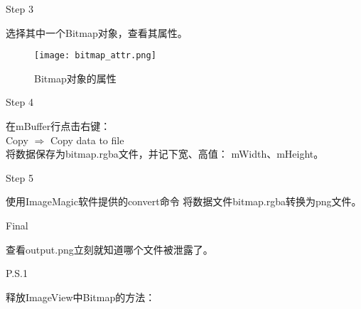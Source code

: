 ﻿\documentclass{beamer}
\begin{document}
  \begin{frame}{Step 3}
  \begin{framedtext}
    选择其中一个Bitmap对象，查看其属性。
  \end{framedtext}
  \end{frame}

  \begin{frame}
    \begin{figure}
      \centering
      \texttt{[image: bitmap\_attr.png]}\\
      \caption{Bitmap对象的属性}\label{fig:attr}
    \end{figure}
  \end{frame}

  \begin{frame}{Step 4}
  \begin{framedtext}
    在mBuffer行点击右键：\\
    Copy $\Rightarrow$ Copy data to file\\
    将数据保存为bitmap.rgba文件，并记下宽、高值：
    mWidth、mHeight。
  \end{framedtext}
  \end{frame}

  \begin{frame}{Step 5}
  \begin{framedtext}
    使用ImageMagic软件提供的convert命令
    将数据文件bitmap.rgba转换为png文件。
  \end{framedtext}
  \end{frame}

  \begin{frame}
  \end{frame}

  \begin{frame}{Final}
  \begin{framedtext}
    查看output.png立刻就知道哪个文件被泄露了。
  \end{framedtext}
  \end{frame}

  \begin{frame}{P.S.1}
    \begin{framedtext}
      释放ImageView中Bitmap的方法：
    \end{framedtext}
  \end{frame}
  
\end{document}
